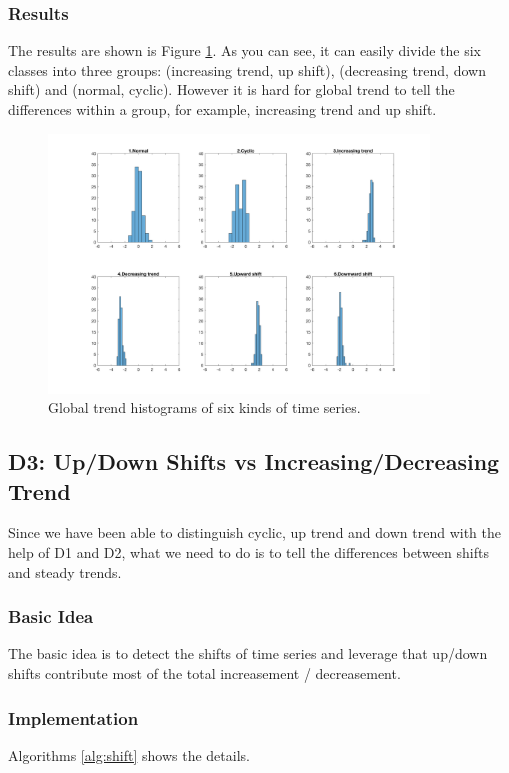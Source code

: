 \documentclass[a4paper]{article}
\begin{document}
\subsubsection{Results}
The results are shown is Figure \ref{fig:gt}. As you can see, it can easily divide the six classes into three groups: (increasing trend, up shift), (decreasing trend, down shift) and (normal, cyclic). However it is hard for global trend to tell the differences within a group, for example, increasing trend and up shift.

\begin{figure}[htbp]
\centering
\includegraphics[width=0.9\textwidth]{gt.png}
\caption{\label{fig:gt}Global trend histograms of six kinds of time series.}
\end{figure}

\subsection{D3: Up/Down Shifts vs Increasing/Decreasing Trend}
Since we have been able to distinguish cyclic, up trend and down trend with the help of D1 and D2, what we need to do is to tell the differences between shifts and steady trends.
\subsubsection{Basic Idea}
The basic idea is to detect the shifts of time series and leverage that up/down shifts contribute most of the total increasement / decreasement.

\subsubsection{Implementation}
Algorithms \ref{alg:shift} shows the details.
\end{document}
